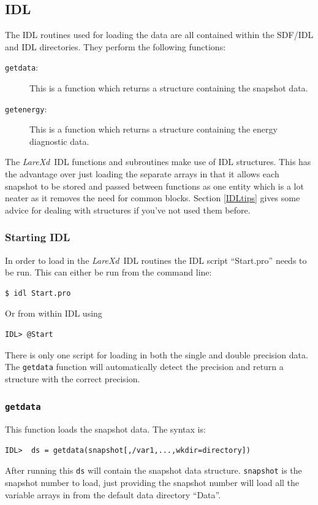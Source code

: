 \documentclass[11pt]{article}
\newcommand{\lare}{{\it LareXd}\ }
\begin{document}
\subsection{IDL}
The IDL routines used for loading the data are all contained within the SDF/IDL and IDL directories. They perform the following functions:
\begin{description}
\item[\texttt{getdata}:] This is a function which returns a structure containing the snapshot data.
\item[\texttt{getenergy}:]  This is a function which returns a structure containing the energy diagnostic data.
\end{description}

The \lare IDL functions and subroutines make use of IDL structures. This has the advantage over just loading the 
separate arrays in that it allows each snapshot to be stored and passed between functions as one entity which is 
a lot neater as it removes the need for common blocks. Section \ref{IDLtips} gives some advice for dealing with 
structures if you've not used them before.

\subsubsection{Starting IDL}
In order to load in the \lare IDL routines the IDL script ``Start.pro'' needs to be run. This can either be run from the command line:
\begin{verbatim}
$ idl Start.pro
\end{verbatim}
Or from within IDL using
\begin{verbatim}
IDL> @Start
\end{verbatim}

There is only one script for loading in both the single and double precision data. The \texttt{getdata} function 
will automatically detect the precision and return a structure with the correct precision.

\subsubsection{\texttt{getdata}}
This function loads the snapshot data. The syntax is:
\begin{verbatim}
IDL>  ds = getdata(snapshot[,/var1,...,wkdir=directory])
\end{verbatim}

After running this \texttt{ds} will contain the snapshot data structure. \texttt{snapshot} is the snapshot number 
to load, just providing the snapshot number will load all the variable arrays in from the default data directory ``Data''.
\end{document}

